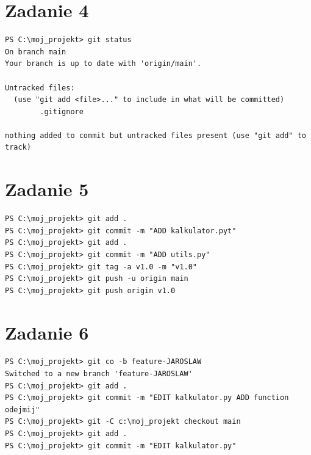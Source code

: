 \documentclass{article}
\begin{document}
    \section{Zadanie 4}
    	\begin{lstlisting}
PS C:\moj_projekt> git status
On branch main
Your branch is up to date with 'origin/main'.

Untracked files:
  (use "git add <file>..." to include in what will be committed)
        .gitignore

nothing added to commit but untracked files present (use "git add" to track)
	\end{lstlisting}
		
        \section{Zadanie 5}
    	\begin{lstlisting}
PS C:\moj_projekt> git add .
PS C:\moj_projekt> git commit -m "ADD kalkulator.pyt"
PS C:\moj_projekt> git add .                         
PS C:\moj_projekt> git commit -m "ADD utils.py" 
PS C:\moj_projekt> git tag -a v1.0 -m "v1.0" 
PS C:\moj_projekt> git push -u origin main 
PS C:\moj_projekt> git push origin v1.0

	\end{lstlisting}

            \section{Zadanie 6}
    	\begin{lstlisting}
PS C:\moj_projekt> git co -b feature-JAROSLAW
Switched to a new branch 'feature-JAROSLAW'
PS C:\moj_projekt> git add .
PS C:\moj_projekt> git commit -m "EDIT kalkulator.py ADD function odejmij"
PS C:\moj_projekt> git -C c:\moj_projekt checkout main
PS C:\moj_projekt> git add .
PS C:\moj_projekt> git commit -m "EDIT kalkulator.py"  

	\end{lstlisting}
	
	
\end{document}
